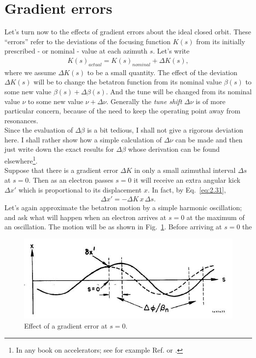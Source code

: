 \section{Gradient errors}\label{sec:2.11}

Let's turn now to the effects of gradient errors about the ideal closed orbit. These ``errors'' refer to the deviations of the focusing function $K(s)$ from its initially prescribed
- or nominal - value at each azimuth $s$. Let's write
\begin{align}
	K(s)_{actual} = K(s)_{nominal} + \Delta K (s),
\end{align}
where we assume $\Delta K(s)$ to be a small quantity. The effect of the deviation $\Delta K(s)$ will be to change the betatron function from its nominal value $\beta(s)$ to some new value $\beta(s)+\Delta\beta(s)$. And the tune will be changed from its nominal value $\nu$ to some new value $\nu + \Delta\nu$. Generally the \emph{tune shift} $\Delta\nu$ is of more particular concern, because of the need to keep the operating point away from resonances.\\
Since the evaluation of $\Delta\beta$ is a bit tedious, I shall not give a rigorous deviation
here. I shall rather show how a simple calculation of $\Delta\nu$ can be made and then just write down the exact results for $\Delta\beta$ whose derivation can be found elsewhere\footnote{In any book on accelerators; see for example Ref. \cite{5} or \cite{7}.}.\\
Suppose that there is a gradient error $\Delta K$ in only a small azimuthal interval $\Delta s$ at $s = 0$. Then as an electron passes $s = 0$ it will receive an extra angular kick $\Delta x'$ which is proportional to its displacement $x$. In fact, by Eq.~\eqref{eq:2.31},
\begin{align}\label{eq:2.96}
	\Delta x' = - \Delta K\, x\, \Delta s.
\end{align}
Let's again approximate the betatron motion by a simple harmonic oscillation; and ask what will happen when an electron arrives at $s = 0$ at the maximum of an oscillation. The motion will be as shown in Fig.~\ref{fig:fig23}. Before arriving at $s = 0$ the
\begin{figure}[!htb]
	\centering
	\includegraphics[width=0.8\linewidth]{./Figuras/fig23.jpeg}
	\caption{Effect of a gradient error at $s = 0$.}
	\label{fig:fig23}
\end{figure}
